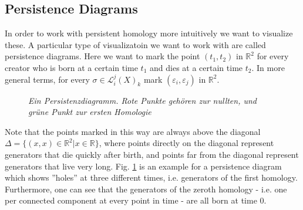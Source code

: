 \documentclass[11pt, a4paper,draft]{report}
\newcommand{\bR}{\mathbb{R}}
\begin{document}
	\subsection{Persistence Diagrams}
	
	In order to work with persistent homology more intuitively we want to visualize these. A particular type of visualizatoin we want to work with are called persistence diagrams. Here we want to mark the point $(t_1,t_2)$ in $\bR^2$ for every creator who is born at a certain time $t_1$ and dies at a certain time $t_2$. In more general terms, for every $\sigma\in\mathcal{L}_i^j(X)_k$ mark $(\varepsilon_i,\varepsilon_j)$ in $\bR^2$.\\
	\begin{figure}
		\centering
	\caption{\textit{Ein Persistenzdiagramm. Rote Punkte gehören zur nullten, und grüne Punkt zur ersten Homologie}}
\label{fig2}
	\end{figure}

 Note that the points marked in this way are always above the diagonal $\Delta=\{(x,x)\in\bR^2|x\in\bR\}$, where points directly on the diagonal represent generators that die quickly after birth, and points far from the diagonal represent generators that live very long. Fig. \ref{fig2} is an example for a persistence diagram which shows ''holes'' at three different times, i.e. generators of the first homology. Furthermore, one can see that the generators of the zeroth homology - i.e. one per connected component at every point in time - are all born at time 0.\\
\end{document}
